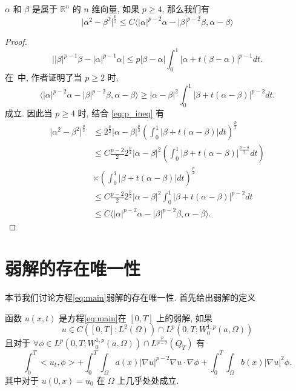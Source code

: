 \documentclass[oneside,longtitle]{LZUthesis}
\numberwithin{equation}{chapter}
\newcommand*\abs[1]{\lvert#1\rvert}
\newcommand\R{\mathbb{R}}
\begin{document}
\begin{lemma}\label{lem:VecIneq}
	$\alpha$ 和 $\beta$ 是属于 $\R^{n}$ 的 $n$ 维向量, 如果 $p \geq 4$, 那么我们有
	\begin{equation*}
		\abs{\alpha^2 - \beta^2}^{\frac{p}{2}}
		\leq C \langle \abs{\alpha}^{p-2}\alpha - \abs{\beta}^{p-2}\beta, \alpha-\beta\rangle
	\end{equation*}
\end{lemma}
\begin{proof}
	\begin{equation*}
		\abs{\abs{\beta}^{p-1}\beta - \abs{\alpha}^{p-1}\alpha} \leq p\abs{\beta-\alpha}\int_0^1 \abs{\alpha + t(\beta - \alpha)}^{p-1}dt.
	\end{equation*}
	在~\cite{lindqvistNotesStationaryPLaplace2019}中, 作者证明了当 $p \geq 2$ 时, 
	\begin{equation}\label{eq:VecIneq_1}
		\langle \abs{\alpha}^{p-2}\alpha - \abs{\beta}^{p-2}\beta, \alpha-\beta\rangle
		\geq \abs{\alpha-\beta}^2\int_0^1 \abs{\beta + t(\alpha - \beta)}^{p-2}dt.
	\end{equation}
	成立.
	因此当 $p \geq 4$ 时, 结合 \cref{eq:p_ineq} 有
	\begin{equation*}
		\begin{split}
			\abs{\alpha^2 - \beta^2}^{\frac{p}{2}}
			&\leq 2^{\frac{p}{2}}\abs{\alpha-\beta}^{\frac{p}{2}}
			\left(\int_0^1 \abs{\beta + t(\alpha - \beta)}dt\right)^{\frac{p}{2}}\\
			&\leq C\frac{p-2}{2}2^{\frac{p}{2}}\abs{\alpha-\beta}^2
			\left(\int_0^1 \abs{\beta + t(\alpha - \beta)}^{\frac{p-4}{2}}dt\right)\\
			&\times\left(\int_0^1 \abs{\beta + t(\alpha - \beta)}dt\right)^{\frac{p}{2}}\\
			&\leq C\frac{p-2}{2}2^{\frac{p}{2}}\abs{\alpha-\beta}^2
			\int_0^1 \abs{\beta + t(\alpha - \beta)}^{p-2}dt\\
			&\leq C \langle \abs{\alpha}^{p-2}\alpha - \abs{\beta}^{p-2}\beta, \alpha-\beta\rangle.
		\end{split}
	\end{equation*}
\end{proof}

\section{弱解的存在唯一性}
本节我们讨论方程\eqref{eq:main}弱解的存在唯一性. 首先给出弱解的定义
\begin{definition}
	函数 $u(x, t)$ 是方程\eqref{eq:main}在 $[0, T]$ 上的弱解, 如果
	\begin{equation*}
		u \in C([0, T]; L^2(\Omega))\cap L^p(0, T; W_0^{1,p}(a,\Omega))
	\end{equation*}
	且对于 $\forall \phi \in L^p(0, T; W_0^{1,p}(a,\Omega))\cap L^{\frac{p}{p-2}}(Q_T)$ 有
	\begin{equation*}
		\int_0^T <u_t, \phi> + \int_0^T\int_\Omega a(x)\abs{\nabla u}^{p - 2}\nabla u \cdot \nabla \phi
		+ \int_0^T\int_\Omega b(x)\abs{\nabla u}^2\phi.
	\end{equation*}
	其中对于 $u(0, x) = u_0$ 在 $\Omega$ 上几乎处处成立.
\end{definition}
\end{document}
